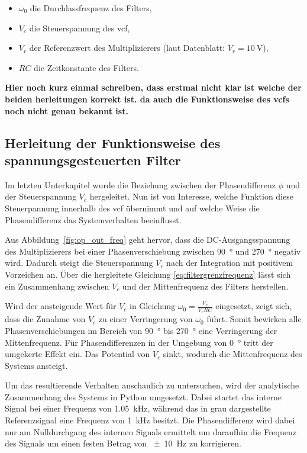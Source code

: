 \documentclass[../main.tex]{subfiles}
\begin{document}
\begin{itemize}
\item $\omega_0$ die Durchlassfrequenz des Filters,
\item $V_c$ die Steuerspannung des \gls{vcf},
\item $V_r$ der Referenzwert des Multiplizierers (laut Datenblatt: $V_r = \SI{10}{\volt}$),
\item $RC$ die Zeitkonstante des Filters.
\end{itemize}

\textbf{Hier noch kurz einmal schreiben, dass erstmal nicht klar ist welche der beiden herleitungen korrekt ist. da auch die Funktionsweise des vcfs noch nicht genau bekannt ist. }




\subsection*{Herleitung der Funktionsweise des spannungsgesteuerten Filter}
\label{sec:herleitung_vcf}

\medskip
Im letzten Unterkapitel wurde die Beziehung zwischen der Phasendifferenz $\phi$ und der Steuerspannung $V_c$ hergeleitet. Nun ist von Interesse, welche Funktion diese Steuerpannung innerhalb des \gls{vcf} übernimmt und auf welche Weise die Phasendifferenz das Systemverhalten beeinflusst.\par
\medskip

Aus Abbildung~\ref{fig:op_out_freq} geht hervor, dass die DC-Ausgangsspannung des Multiplizierers bei einer Phasenverschiebung zwischen \SI{90}{\degree} und \SI{270}{\degree} negativ wird. Dadurch steigt die Steuerspannung $V_c$ nach der Integration mit positivem Vorzeichen an. Über die hergleitete Gleichung \ref{eq:filtergrenzfrequenz} lässt sich ein Zusammenhang zwischen $V_c$ und der Mittenfrequenz des Filters herstellen.\par
\medskip
Wird der ansteigende Wert für $V_c$ in Gleichung $\omega_0 = \frac{V_r}{V_cRC}$ eingesetzt, zeigt sich, dass die Zunahme von $V_c$ zu einer Verringerung von $\omega_0$ führt. Somit bewirken alle Phasenverschiebungen im Bereich von \SI{90}{\degree} bis \SI{270}{\degree} eine Verringerung der Mittenfrequenz. Für Phasendifferenzen in der Umgebung von \SI{0}{\degree} tritt der umgekerte Effekt ein. Das Potential von $V_c$ sinkt, wodurch die Mittenfrequenz des Systems ansteigt.\par 
\medskip
Um das resultierende Verhalten anschaulich zu untersuchen, wird der analytische Zusammenhang des Systems in Python umgesetzt. Dabei startet das interne Signal bei einer Frequenz von \SI{1.05}{\kilo\hertz}, während das in grau dargestellte  Referenzsignal eine Frequenz von \SI{1}{\kilo\hertz} besitzt. Die Phasendifferenz wird dabei nur am Nulldurchgang des internen Signals ermittelt um daraufhin die Frequenz des Signals um einen festen Betrag von \SI{\pm10}{\hertz} zu korrigieren. \par
\medskip
\end{document}
